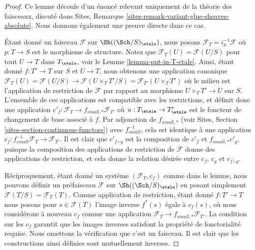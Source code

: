 \begin{proof}
Ce lemme découle d'un énoncé relevant uniquement de la théorie des faisceaux, discuté dans Sites, Remarque \ref{sites-remark-variant-glue-sheaves-absolute}. Nous donnons également une preuve directe dans ce cas.

\medskip\noindent
Étant donné un faisceau $\mathcal{F}$ sur $\Sh((\Sch/S)_\etale)$, nous posons $\mathcal{F}_T = i_p^{-1}\mathcal{F}$ où $p : T \to S$ est le morphisme de structure. Notez que $\mathcal{F}_T(U) = \mathcal{F}(U/S)$ pour tout $U \to T$ dans $T_\etale$, voir le Lemme \ref{lemma-put-in-T-etale}. Ainsi, étant donné $f : T' \to T$ sur $S$ et $U \to T$, nous obtenons une application canonique $\mathcal{F}_T(U) = \mathcal{F}(U/S) \to \mathcal{F}(U \times_T T'/S) = \mathcal{F}_{T'}(U \times_T T')$ où le milieu est l'application de restriction de $\mathcal{F}$ par rapport au morphisme $U \times_T T' \to U$ sur $S$. L'ensemble de ces applications est compatible avec les restrictions, et définit donc une application $c'_f : \mathcal{F}_T \to f_{small, *}\mathcal{F}_{T'}$ où $u : T_\etale \to T'_\etale$ est le foncteur de changement de base associé à $f$. Par adjonction de $f_{small, *}$ (voir Sites, Section \ref{sites-section-continuous-functors}) avec $f_{small}^{-1}$, cela est identique à une application $c_f : f_{small}^{-1}\mathcal{F}_T \to \mathcal{F}_{T'}$. Il est clair que $c'_{f \circ g}$ est la composition de $c'_f$ et $f_{small, *}c'_g$, puisque la composition des applications de restriction de $\mathcal{F}$ donne des applications de restriction, et cela donne la relation désirée entre $c_f$, $c_g$ et $c_{f \circ g}$.

\medskip\noindent
Réciproquement, étant donné un système $(\mathcal{F}_T, c_f)$ comme dans le lemme, nous pouvons définir un préfaisceau $\mathcal{F}$ sur $\Sh((\Sch/S)_\etale)$ en posant simplement $\mathcal{F}(T/S) = \mathcal{F}_T(T)$. Comme application de restriction, étant donné $f : T' \to T$ nous posons pour $s \in \mathcal{F}(T)$ l'image inverse $f^*(s)$ égale à $c_f(s)$, où nous considérons à nouveau $c_f$ comme une application $\mathcal{F}_T \to f_{small, *}\mathcal{F}_{T'}$. La condition sur les $c_f$ garantit que les images inverses satisfont la propriété de fonctorialité requise. Nous omettons la vérification que c'est un faisceau. Il est clair que les constructions ainsi définies sont mutuellement inverses.
\end{proof}























